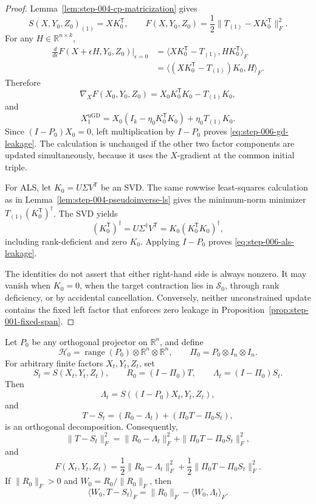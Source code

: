 \begin{proof}
Lemma~\ref{lem:step-004-cp-matricization} gives
\[
 S(X,Y_0,Z_0)_{(1)}=XK_0^{\mathsf T},
 \qquad
 F(X,Y_0,Z_0)=\frac12\|T_{(1)}-XK_0^{\mathsf T}\|_F^2.
\]
For any $H\in\mathbb R^{n\times k}$,
\[
 \begin{aligned}
 \frac{d}{d\epsilon}F(X+\epsilon H,Y_0,Z_0)\bigg|_{\epsilon=0}
 &=\langle XK_0^{\mathsf T}-T_{(1)},HK_0^{\mathsf T}\rangle_F\\
 &=\langle(XK_0^{\mathsf T}-T_{(1)})K_0,H\rangle_F.
 \end{aligned}
\]
Therefore
\[
 \nabla_XF(X_0,Y_0,Z_0)
 =X_0K_0^{\mathsf T}K_0-T_{(1)}K_0,
\]
and
\[
 X_1^{\mathrm{uGD}}
 =X_0(I_k-\eta_0K_0^{\mathsf T}K_0)+\eta_0T_{(1)}K_0.
\]
Since $(I-P_0)X_0=0$, left multiplication by $I-P_0$ proves
\eqref{eq:step-006-gd-leakage}.  The calculation is unchanged if the other
two factor components are updated simultaneously, because it uses the
$X$-gradient at the common initial triple.

For ALS, let $K_0=U\Sigma V^{\mathsf T}$ be an SVD.  The same rowwise
least-squares calculation as in
Lemma~\ref{lem:step-004-pseudoinverse-ls} gives the minimum-norm minimizer
$T_{(1)}(K_0^{\mathsf T})^\dagger$.  The SVD yields
\[
 (K_0^{\mathsf T})^\dagger
 =U\Sigma^\dagger V^{\mathsf T}
 =K_0(K_0^{\mathsf T}K_0)^\dagger,
\]
including rank-deficient and zero $K_0$.  Applying $I-P_0$ proves
\eqref{eq:step-006-als-leakage}.

The identities do not assert that either right-hand side is always nonzero.
It may vanish when $K_0=0$, when the target contraction lies in
$\mathcal S_0$, through rank deficiency, or by accidental cancellation.
Conversely, neither unconstrained update contains the fixed left factor that
enforces zero leakage in Proposition~\ref{prop:step-001-fixed-span}.
\end{proof}

\begin{proposition}\label{prop:step-006-residual-decomposition}
Let $P_0$ be any orthogonal projector on $\mathbb R^n$, and define
\[
 \mathcal H_0=\operatorname{range}(P_0)\otimes\mathbb R^n\otimes\mathbb R^n,
 \qquad
 \Pi_0=P_0\otimes I_n\otimes I_n.
\]
For arbitrary finite factors $X_t,Y_t,Z_t$, set
\[
 S_t=S(X_t,Y_t,Z_t),
 \qquad
 R_0=(I-\Pi_0)T,
 \qquad
 \Lambda_t=(I-\Pi_0)S_t.
\]
Then
\[
 \Lambda_t=S((I-P_0)X_t,Y_t,Z_t),
 \tag{A.10}\label{eq:step-006-tensor-leakage}
\]
and
\[
 T-S_t=(R_0-\Lambda_t)+(\Pi_0T-\Pi_0S_t),
 \tag{A.11}\label{eq:step-006-residual-split}
\]
is an orthogonal decomposition.  Consequently,
\[
 \|T-S_t\|_F^2
 =\|R_0-\Lambda_t\|_F^2
 +\|\Pi_0T-\Pi_0S_t\|_F^2,
 \tag{A.12}\label{eq:step-006-residual-pythagoras}
\]
and
\[
 F(X_t,Y_t,Z_t)
 =\frac12\|R_0-\Lambda_t\|_F^2
 +\frac12\|\Pi_0T-\Pi_0S_t\|_F^2.
 \tag{A.13}\label{eq:step-006-objective-split}
\]
If $\|R_0\|_F>0$ and $W_0=R_0/\|R_0\|_F$, then
\[
 \langle W_0,T-S_t\rangle_F
 =\|R_0\|_F-\langle W_0,\Lambda_t\rangle_F.
 \tag{A.14}\label{eq:step-006-witness-subtraction}
\]
\end{proposition}

